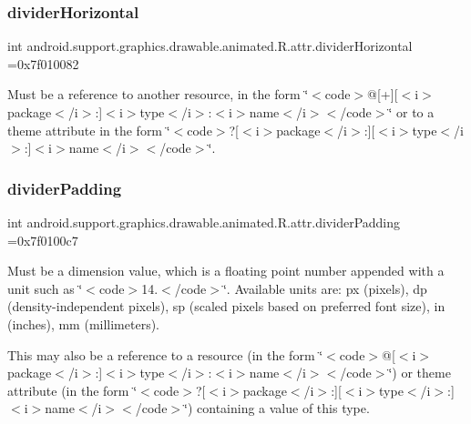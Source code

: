 \subsubsection{\texorpdfstring{divider\+Horizontal}{dividerHorizontal}}
{\footnotesize\ttfamily int android.\+support.\+graphics.\+drawable.\+animated.\+R.\+attr.\+divider\+Horizontal =0x7f010082\hspace{0.3cm}{\ttfamily [static]}}

Must be a reference to another resource, in the form \char`\"{}$<$code$>$@\mbox{[}+\mbox{]}\mbox{[}$<$i$>$package$<$/i$>$\+:\mbox{]}$<$i$>$type$<$/i$>$\+:$<$i$>$name$<$/i$>$$<$/code$>$\char`\"{} or to a theme attribute in the form \char`\"{}$<$code$>$?\mbox{[}$<$i$>$package$<$/i$>$\+:\mbox{]}\mbox{[}$<$i$>$type$<$/i$>$\+:\mbox{]}$<$i$>$name$<$/i$>$$<$/code$>$\char`\"{}. \mbox{\label{classandroid_1_1support_1_1graphics_1_1drawable_1_1animated_1_1R_1_1attr_a52752c4e819e4372d0886d8f1ef2199d}} 
\subsubsection{\texorpdfstring{divider\+Padding}{dividerPadding}}
{\footnotesize\ttfamily int android.\+support.\+graphics.\+drawable.\+animated.\+R.\+attr.\+divider\+Padding =0x7f0100c7\hspace{0.3cm}{\ttfamily [static]}}

Must be a dimension value, which is a floating point number appended with a unit such as \char`\"{}$<$code$>$14.\+5sp$<$/code$>$\char`\"{}. Available units are\+: px (pixels), dp (density-\/independent pixels), sp (scaled pixels based on preferred font size), in (inches), mm (millimeters). 

This may also be a reference to a resource (in the form \char`\"{}$<$code$>$@\mbox{[}$<$i$>$package$<$/i$>$\+:\mbox{]}$<$i$>$type$<$/i$>$\+:$<$i$>$name$<$/i$>$$<$/code$>$\char`\"{}) or theme attribute (in the form \char`\"{}$<$code$>$?\mbox{[}$<$i$>$package$<$/i$>$\+:\mbox{]}\mbox{[}$<$i$>$type$<$/i$>$\+:\mbox{]}$<$i$>$name$<$/i$>$$<$/code$>$\char`\"{}) containing a value of this type. \mbox{\label{classandroid_1_1support_1_1graphics_1_1drawable_1_1animated_1_1R_1_1attr_aab95d9d8313b9ac9f9b3e98d9b1c67a4}} 
